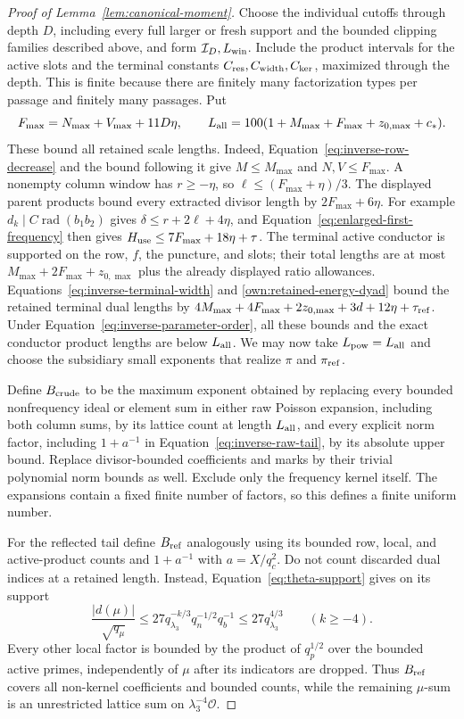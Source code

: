 \documentclass[12pt]{article}
\begin{document}
\begin{proof}[Proof of Lemma~\ref{lem:canonical-moment}]
Choose the individual cutoffs through depth \(D\), including every full
larger or fresh support and the bounded clipping families described
above, and form \(\mathcal I_D,L_{\rm win}\).  Include the product
intervals for the active slots and the terminal constants
\(C_{\rm res},C_{\rm width},C_{\rm ker}\), maximized through the depth.
This is finite because there are finitely many factorization types per
passage and finitely many passages.  Put
\[
 F_{\max}=N_{\max}+V_{\max}+11D\eta,\qquad
 L_{\rm all}=100(1+M_{\max}+F_{\max}+z_{0,\max}+c_*).
\]
These bound all retained scale lengths.  Indeed,
Equation~\eqref{eq:inverse-row-decrease} and the bound following it give
\(M\le M_{\max}\) and \(N,V\le F_{\max}\).  A nonempty column window has
\(r\ge-\eta\), so \(\ell\le(F_{\max}+\eta)/3\).  The displayed parent
products bound every extracted divisor length by \(2F_{\max}+6\eta\).
For example \(d_k\mid C\operatorname{rad}(b_1b_2)\) gives
\(\delta\le r+2\ell+4\eta\), and Equation~\eqref{eq:enlarged-first-frequency}
then gives \(H_{\rm use}\le7F_{\max}+18\eta+\tau\).  The terminal active
conductor is supported on the row, \(f\), the puncture, and slots; their
total lengths are at most \(M_{\max}+2F_{\max}+z_{0,\max}\) plus the
already displayed ratio allowances.  Equations~\eqref{eq:inverse-terminal-width}
and \eqref{own:retained-energy-dyad} bound the retained terminal dual lengths by
\(4M_{\max}+4F_{\max}+2z_{0,\max}+3d+12\eta+\tau_{\rm ref}\).
Under Equation~\eqref{eq:inverse-parameter-order}, all these bounds and
the exact conductor product lengths are below \(L_{\rm all}\).
We may now take \(L_{\rm pow}=L_{\rm all}\) and choose the subsidiary
small exponents that realize \(\pi\) and \(\pi_{\rm ref}\).

Define \(B_{\rm crude}\) to be the maximum exponent obtained by replacing
every bounded nonfrequency ideal or element sum in either raw Poisson
expansion, including both column sums, by its lattice count at length
\(L_{\rm all}\), and every explicit norm factor, including \(1+a^{-1}\)
in Equation~\eqref{eq:inverse-raw-tail}, by its absolute upper bound.
Replace divisor-bounded coefficients and marks by their trivial polynomial
norm bounds as well.
Exclude only the frequency kernel itself.  The expansions contain a
fixed finite number of factors, so this defines a finite uniform number.

For the reflected tail define \(B_{\rm ref}\) analogously using its bounded
row, local, and active-product counts and \(1+a^{-1}\) with \(a=X/q_c^2\).
Do not count discarded dual indices at a retained length.  Instead,
Equation~\eqref{eq:theta-support} gives on its support
\[
 \frac{|d(\mu)|}{\sqrt{q_\mu}}
 \le27q_{\lambda_3}^{-k/3}q_n^{-1/2}q_b^{-1}
 \le27q_{\lambda_3}^{4/3}\qquad(k\ge-4).
\]
Every other local factor is bounded by the product of \(q_p^{1/2}\) over
the bounded active primes, independently of \(\mu\) after its indicators
are dropped.  Thus \(B_{\rm ref}\) covers all non-kernel coefficients and
bounded counts, while the remaining \(\mu\)-sum is an unrestricted
lattice sum on \(\lambda_3^{-4}\mathcal O\).


\end{proof}
\end{document}
